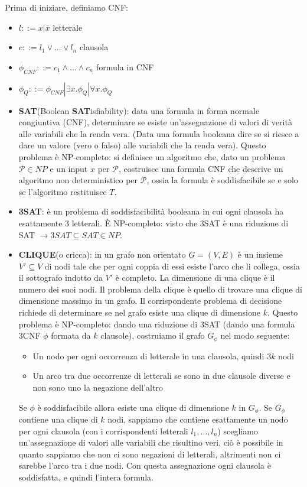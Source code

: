 \documentclass[12pt]{article}
\begin{document}
Prima di iniziare, definiamo CNF:
\begin{itemize}
    \item $ l ::= x|\bar{x} $ letterale
    \item $ c ::= l_{1}\lor\ldots\lor l_{n} $ clausola
    \item $ \phi_{CNF} ::= c_{1}\land\ldots\land c_{n} $ formula in CNF
    \item $ \phi_{Q} ::= \phi_{CNF}|\exists x.\phi_{Q}|\forall x.\phi_{Q} $
\end{itemize}
\begin{itemize}
    \item \textbf{SAT}(Boolean \textbf{SAT}isfiability): data una formula in forma normale congiuntiva (CNF), determinare se esiste un'assegnazione di valori di verità alle variabili che la renda vera. (Data una formula booleana dire se si riesce a dare un valore (vero o falso) alle variabili che la renda vera). Questo problema è NP-completo: si definisce un algoritmo che, dato un problema $\mathcal{P}\in NP$ e un input $x$ per $\mathcal{P}$, costruisce una formula CNF che descrive un algoritmo non deterministico per $\mathcal{P}$, ossia la formula è soddisfacibile se e solo se l'algoritmo restituisce $T$.
    \item \textbf{3SAT}: è un problema di soddisfacibilità booleana in cui ogni clausola ha esattamente 3 letterali. È NP-completo: visto che 3SAT è una riduzione di SAT $\rightarrow 3SAT\subseteq SAT \in NP$.
    \item \textbf{CLIQUE}(o cricca): in un grafo non orientato $G=(V,E)$ è un insieme $V'\subseteq V$ di nodi tale che per ogni coppia di essi esiste l'arco che li collega, ossia il sottografo indotto da $V'$ è completo. La dimensione di una clique è il numero dei suoi nodi. Il problema della clique è quello di trovare una clique di dimensione massimo in un grafo. Il corrispondente problema di decisione richiede di determinare se nel grafo esiste una clique di dimensione $k$. Questo problema è NP-completo: dando una riduzione di 3SAT (dando una formula 3CNF $\phi$ formata da $k$ clausole), costruiamo il grafo $G_{\phi}$ nel modo seguente: \begin{itemize}
        \item Un nodo per ogni occorrenza di letterale in una clausola, quindi $3k$ nodi
        \item Un arco tra due occorrenze di  letterali se sono in due clausole diverse e non sono uno la negazione dell'altro
    \end{itemize}
    Se $\phi$ è soddisfacibile allora esiste una clique di dimensione $k$ in $G_{\phi}$. Se $G_{\phi}$ contiene una clique di $k$ nodi, sappiamo che contiene esattamente un nodo per ogni clausola (con i corrispondenti letterali $l_{1},\ldots,l_{n}$) scegliamo un'assegnazione di valori alle variabili che risultino veri, ciò è possibile in quanto sappiamo che non ci sono negazioni di letterali, altrimenti non ci sarebbe l'arco tra i due nodi. Con questa assegnazione ogni clausola è soddisfatta, e quindi l'intera formula.
\end{itemize}
\end{document}
